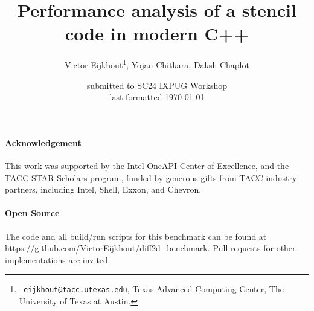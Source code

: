 \documentclass[11pt,fleqn]{IEEEtran}
\begin{document}
\title{Performance analysis of a stencil code in modern C++}
\author{Victor Eijkhout\thanks{{\tt
      eijkhout@tacc.utexas.edu}, Texas Advanced Computing Center, The
    University of Texas at Austin.
  }, Yojan Chitkara, Daksh Chaplot}
\date{submitted to SC24 IXPUG Workshop\\ last formatted \today}
\maketitle



\paragraph*{Acknowledgement}
This work was supported by
the Intel OneAPI Center of Excellence, and the 
TACC STAR Scholars program,
funded by generous gifts from TACC industry partners, including Intel, Shell, Exxon, and Chevron.

\paragraph*{Open Source}
The code and all build/run scripts for this benchmark
can be found at
\url{https://github.com/VictorEijkhout/diff2d_benchmark}.
Pull requests for other implementations
are invited.



\end{document}
